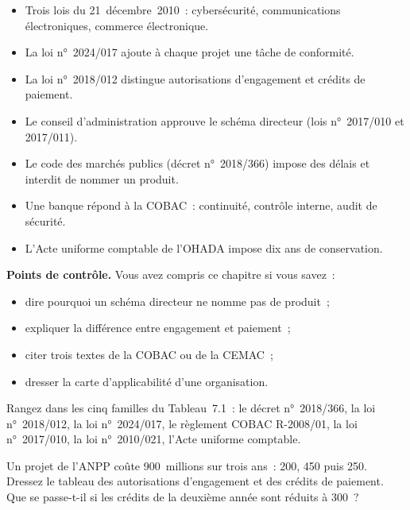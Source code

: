 \begin{boxresume}
\begin{itemize}
    \item Trois lois du 21~décembre~2010~: cybersécurité, communications électroniques, commerce électronique.
    \item La loi n°~2024/017 ajoute à chaque projet une tâche de conformité.
    \item La loi n°~2018/012 distingue autorisations d'engagement et crédits de paiement.
    \item Le conseil d'administration approuve le schéma directeur (lois n°~2017/010 et 2017/011).
    \item Le code des marchés publics (décret n°~2018/366) impose des délais et interdit de nommer un produit.
    \item Une banque répond à la COBAC~: continuité, contrôle interne, audit de sécurité.
    \item L'Acte uniforme comptable de l'OHADA impose dix ans de conservation.
\end{itemize}
\end{boxresume}

\begin{boxinfo}
\textbf{Points de contrôle.} Vous avez compris ce chapitre si vous savez~:
\begin{itemize}
    \item dire pourquoi un schéma directeur ne nomme pas de produit~;
    \item expliquer la différence entre engagement et paiement~;
    \item citer trois textes de la COBAC ou de la CEMAC~;
    \item dresser la carte d'applicabilité d'une organisation.
\end{itemize}
\end{boxinfo}

\begin{boxexo}[title={\ding{45}\quad Exercice~7.1. Quelle famille \niveaubase}]
Rangez dans les cinq familles du Tableau~7.1~: le décret n°~2018/366, la loi n°~2018/012, la loi n°~2024/017, le règlement COBAC R-2008/01, la loi n°~2017/010, la loi n°~2010/021, l'Acte uniforme comptable.
\end{boxexo}

\begin{boxexo}[title={\ding{45}\quad Exercice~7.2. Engagement et paiement \niveaumoyen}]
Un projet de l'ANPP coûte 900~millions sur trois ans~: 200, 450 puis 250. Dressez le tableau des autorisations d'engagement et des crédits de paiement. Que se passe-t-il si les crédits de la deuxième année sont réduits à 300~?
\end{boxexo}

